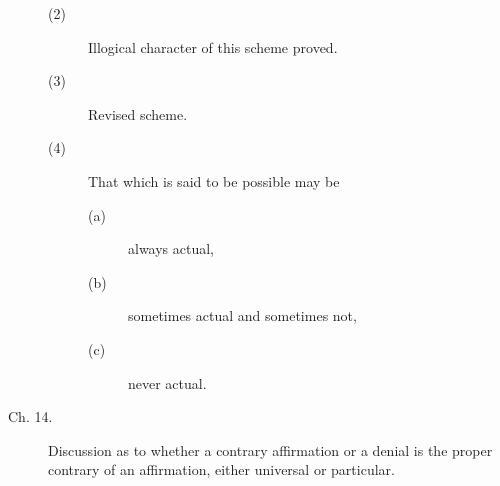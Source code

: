 \begin{description}
\begin{description}
\item[(2)] Illogical character of this scheme proved. 

\item[(3)] Revised scheme. 

\item[(4)] That which is said to be possible may be

\begin{description}
\item[(a)] always actual, 
\item[(b)] sometimes actual and sometimes not,
\item[(c)] never actual. 
\end{description}

\end{description}

\item[Ch. 14.] Discussion as to whether a contrary affirmation or a denial 
is the proper contrary of an affirmation, either universal or particular. 

\end{description}

\renewcommand{\aref}{\arefC}
